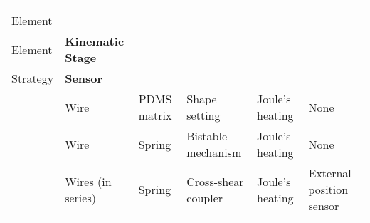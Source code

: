 \documentclass[border=1mm,
               class=article
               preview]{standalone}
\begin{document}
\renewcommand{\arraystretch}{1.5}
 {\footnotesize{}
\begin{tabular}{p{}
                p{}
                p{}
                p{}
                p{}
                p{}}
   \rowcolor{black}  & \textbf{\color{white} \parbox[t]{1.5cm}{Active\\Element}} & \textbf{\color{white} \parbox[t]{1.5cm}{Biasing\\Element}} & \textbf{\color{white} Kinematic Stage} & \textbf{\color{white} \parbox[t]{1.5cm}{Heating\\Strategy}} & \textbf{\color{white} Sensor}\\
   \cite{rodrigueCurvedShapeMemory2017a} & Wire & PDMS matrix & Shape setting & Joule's heating & None\\
   \cite{motzkiEnergyefficientSMAVacuum2016} & Wire & Spring & Bistable mechanism & Joule's heating & None\\
   \cite{luNovelDesignParallel2019} & Wires (in series) & Spring & Cross-shear coupler & Joule's heating & External position sensor\\
\end{tabular}}
\renewcommand{\arraystretch}{1}
\end{document}
